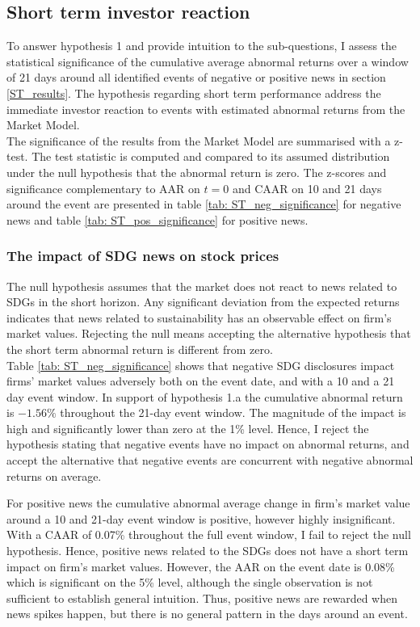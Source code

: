 \subsection{Short term investor reaction} \label{sec: short_term_analysis}
To answer hypothesis 1 and provide intuition to the sub-questions, I assess the statistical significance of the cumulative average abnormal returns over a window of 21 days around all identified events of negative or positive news in section \ref{ST_results}. The hypothesis regarding short term performance address the immediate investor reaction to events with estimated abnormal returns from the Market Model. \\

The significance of the results from the Market Model are summarised with a z-test. The test statistic is computed and compared to its assumed distribution under the null hypothesis that the abnormal return is zero. The z-scores and significance complementary to AAR on $t=0$ and CAAR on 10 and 21 days around the event are presented in table \ref{tab: ST_neg_significance} for negative news and table \ref{tab: ST_pos_significance} for positive news.  

\subsubsection{The impact of SDG news on stock prices }

The null hypothesis assumes that the market does not react to news related to SDGs in the short horizon. Any significant deviation from the expected returns indicates that news related to sustainability has an observable effect on firm's market values. Rejecting the null means accepting the alternative hypothesis that the short term abnormal return is different from zero. \\
 
Table \ref{tab: ST_neg_significance} shows that negative SDG disclosures impact firms' market values adversely both on the event date, and with a 10 and a 21 day event window. In support of hypothesis 1.a the cumulative abnormal return is $-1.56\%$ throughout the 21-day event window. The magnitude of the impact is high and significantly lower than zero at the 1\% level. Hence, I reject the hypothesis stating that negative events have no impact on abnormal returns, and accept the alternative that negative events are concurrent with negative abnormal returns on average. 

For positive news the cumulative abnormal average change in firm's market value around a 10 and 21-day event window is positive, however highly insignificant. With a CAAR of 0.07\% throughout the full event window, I fail to reject the null hypothesis. Hence, positive news related to the SDGs does not have a short term impact on firm's market values. However, the AAR on the event date is 0.08\% which is significant on the 5\% level, although the single observation is not sufficient to establish general intuition. Thus, positive news are rewarded when news spikes happen, but there is no general pattern in the days around an event.  

